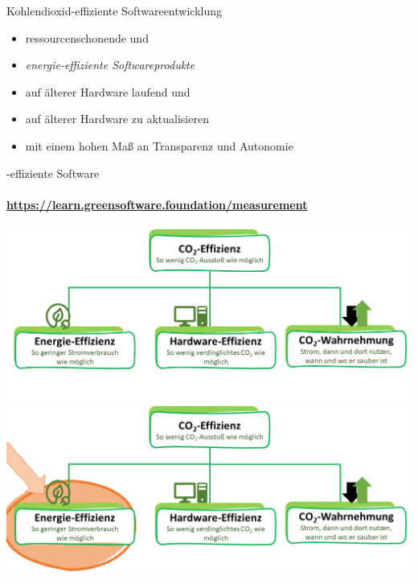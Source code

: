 \begin{frame}{Kohlendioxid-effiziente Softwareentwicklung}

\begin{itemize}
	\item ressourcenschonende und 
	\item \emph{energie-effiziente Softwareprodukte}
	\item auf älterer Hardware laufend und 
	\item  auf älterer Hardware  zu aktualisieren
	\item mit einem hohen Maß an Transparenz und Autonomie
\end{itemize}

\end{frame}


\begin{frame}{\COz-effiziente Software}
\framesubtitle{\href{https://learn.greensoftware.foundation/measurement}{https://learn.greensoftware.foundation/measurement}}
		\begin{overprint}
				\includegraphics[width=1.00\textwidth]{../Figures/CO2awa_1.png}
			 \onslide<2>	  
				\includegraphics[width=1.00\textwidth]{../Figures/CO2awa_2.png}				
		\end{overprint}
\end{frame}


